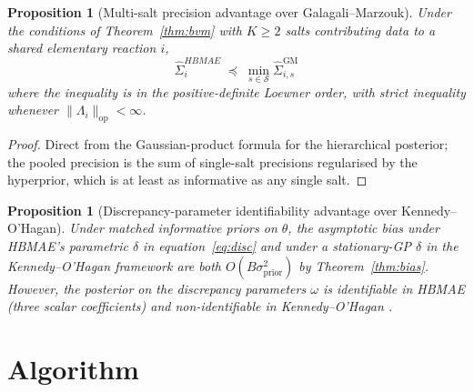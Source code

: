 \documentclass[11pt]{article}
\newtheorem{proposition}[theorem]{Proposition}
\theoremstyle{definition}
\theoremstyle{remark}
\newcommand{\norm}[1]{\lVert #1 \rVert}
\newcommand{\HBMAE}{HBMAE\xspace}
\begin{document}
\begin{proposition}[Multi-salt precision advantage over Galagali--Marzouk]\label{prop:precision}
Under the conditions of Theorem~\ref{thm:bvm} with $K\ge 2$ salts contributing data to a
shared elementary reaction $i$,
\[
  \hat\Sigma_i^{\HBMAE}\;\preceq\;\min_{s\in\mathcal S}\hat\Sigma_{i,s}^{\mathrm{GM}}
\]
where the inequality is in the positive-definite Loewner order, with strict inequality
whenever $\norm{\Lambda_i}_{\mathrm{op}}<\infty$.
\end{proposition}

\begin{proof}
Direct from the Gaussian-product formula for the hierarchical posterior; the pooled
precision is the sum of single-salt precisions regularised by the hyperprior, which is at
least as informative as any single salt.
\end{proof}

\begin{proposition}[Discrepancy-parameter identifiability advantage over Kennedy--O'Hagan]\label{prop:ko}
Under matched informative priors on $\theta$, the asymptotic bias under \HBMAE's
parametric $\delta$ in equation~\eqref{eq:disc} and under a stationary-GP $\delta$ in the
Kennedy--O'Hagan framework are both $O(B\sigma_{\mathrm{prior}}^2)$ by Theorem~\ref{thm:bias}.
However, the posterior on the discrepancy parameters $\omega$ is identifiable in \HBMAE
(three scalar coefficients) and non-identifiable in Kennedy--O'Hagan
\citep{Brynjarsdottir2014}.
\end{proposition}

\section{Algorithm}\label{sec:algorithm}
\end{document}
